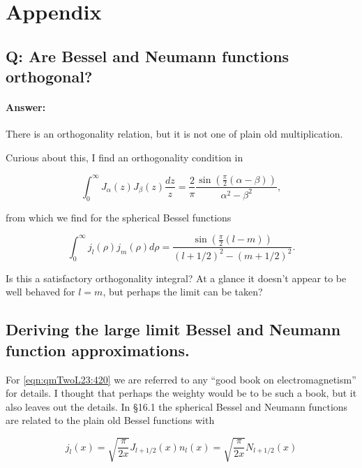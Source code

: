 \section{Appendix}

\subsection{Q: Are Bessel and Neumann functions orthogonal?}

\paragraph{Answer:} There is an orthogonality relation, but it is not one of plain old multiplication.

Curious about this, I find an orthogonality condition in \cite{wiki:bessel}

\begin{equation}\label{eqn:qmTwoL23:640}
\int_0^\infty J_\alpha(z) J_\beta(z) \frac{dz}{z} = \frac{2}{\pi} \frac{\sin\left(\frac{\pi}{2}\left( \alpha - \beta\right) \right) }{\alpha^2 - \beta^2},
\end{equation}

from which we find for the spherical Bessel functions

\begin{equation}\label{eqn:qmTwoL23:660}
\int_0^\infty j_l(\rho) j_m(\rho) d\rho =
\frac{\sin\left(\frac{\pi}{2}\left( l - m \right) \right) }{(l+ 1/2)^2 - (m + 1/2)^2}.
\end{equation}

Is this a satisfactory orthogonality integral?  At a glance it doesn't appear to be well behaved for $l = m$, but perhaps the limit can be taken?


\subsection{Deriving the large limit Bessel and Neumann function approximations.}

For \ref{eqn:qmTwoL23:420} we are referred to any ``good book on electromagnetism'' for details.  I thought that perhaps the weighty \cite{jackson1975cew} would be to be such a book, but it also leaves out the details.  In \S 16.1 the spherical Bessel and Neumann functions are related to the plain old Bessel functions with

\begin{subequations}
\begin{equation}\label{eqn:qmTwoL23:980}
j_l(x) = \sqrt{\frac{\pi}{2x} } J_{l+1/2}(x) 
\end{equation}
\begin{equation}\label{eqn:qmTwoL23:1000}
n_l(x) = \sqrt{\frac{\pi}{2x} } N_{l+1/2}(x)
\end{equation}
\end{subequations}

